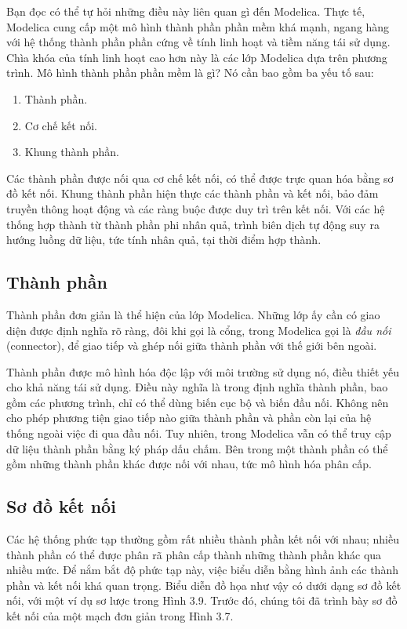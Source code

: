 Bạn đọc có thể tự hỏi những điều này liên quan gì đến Modelica. Thực tế, Modelica cung cấp một mô hình thành phần phần mềm khá mạnh, ngang hàng với hệ thống thành phần phần cứng về tính linh hoạt và tiềm năng tái sử dụng. Chìa khóa của tính linh hoạt cao hơn này là các lớp Modelica dựa trên phương trình. Mô hình thành phần phần mềm là gì? Nó cần bao gồm ba yếu tố sau:
\begin{enumerate}
\item Thành phần.
\item Cơ chế kết nối.
\item Khung thành phần.
\end{enumerate}
Các thành phần được nối qua cơ chế kết nối, có thể được trực quan hóa bằng sơ đồ kết nối. Khung thành phần hiện thực các thành phần và kết nối, bảo đảm truyền thông hoạt động và các ràng buộc được duy trì trên kết nối. Với các hệ thống hợp thành từ thành phần phi nhân quả, trình biên dịch tự động suy ra hướng luồng dữ liệu, tức tính nhân quả, tại thời điểm hợp thành.

\subsection{Thành phần}
Thành phần đơn giản là thể hiện của lớp Modelica. Những lớp ấy cần có giao diện được định nghĩa rõ ràng, đôi khi gọi là cổng, trong Modelica gọi là \emph{đầu nối} (connector), để giao tiếp và ghép nối giữa thành phần với thế giới bên ngoài.

Thành phần được mô hình hóa độc lập với môi trường sử dụng nó, điều thiết yếu cho khả năng tái sử dụng. Điều này nghĩa là trong định nghĩa thành phần, bao gồm các phương trình, chỉ có thể dùng biến cục bộ và biến đầu nối. Không nên cho phép phương tiện giao tiếp nào giữa thành phần và phần còn lại của hệ thống ngoài việc đi qua đầu nối. Tuy nhiên, trong Modelica vẫn có thể truy cập dữ liệu thành phần bằng ký pháp dấu chấm. Bên trong một thành phần có thể gồm những thành phần khác được nối với nhau, tức mô hình hóa phân cấp.

\subsection{Sơ đồ kết nối}
Các hệ thống phức tạp thường gồm rất nhiều thành phần kết nối với nhau; nhiều thành phần có thể được phân rã phân cấp thành những thành phần khác qua nhiều mức. Để nắm bắt độ phức tạp này, việc biểu diễn bằng hình ảnh các thành phần và kết nối khá quan trọng. Biểu diễn đồ họa như vậy có dưới dạng sơ đồ kết nối, với một ví dụ sơ lược trong Hình 3.9. Trước đó, chúng tôi đã trình bày sơ đồ kết nối của một mạch đơn giản trong Hình 3.7.

